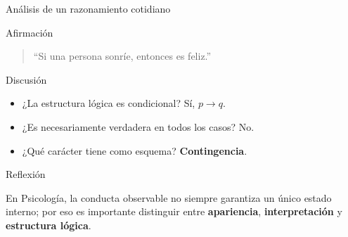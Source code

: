 \documentclass[aspectratio=169,10pt,handout]{beamer}
\newcommand{\destacado}[1]{\textcolor{PsyPrimary}{\textbf{#1}}}
\newenvironment{IdeaClave}[1]
{
	\begin{block}{#1}
		\justifying
	}
	{
	\end{block}
}
\newenvironment{Alerta}[1]
{
	\begin{alertblock}{#1}
		\justifying
	}
	{
	\end{alertblock}
}
\newenvironment{Ejemplo}[1]
{
	\begin{exampleblock}{#1}
		\justifying
	}
	{
	\end{exampleblock}
}
\begin{document}
	\begin{frame}{Análisis de un razonamiento cotidiano}
		\begin{Alerta}{Afirmación}
			\begin{quote}
				``Si una persona sonríe, entonces es feliz.''
			\end{quote}
		\end{Alerta}
		
		\pause
		
		\begin{IdeaClave}{Discusión}
			\begin{itemize}[leftmargin=*]
				\item ¿La estructura lógica es condicional? Sí, $p \to q$.
				\item ¿Es necesariamente verdadera en todos los casos? No.
				\item ¿Qué carácter tiene como esquema? \destacado{Contingencia}.
			\end{itemize}
		\end{IdeaClave}
		
		\pause
		
		\begin{Ejemplo}{Reflexión}
			En Psicología, la conducta observable no siempre garantiza un único estado interno; por eso es importante distinguir entre \destacado{apariencia}, \destacado{interpretación} y \destacado{estructura lógica}.
		\end{Ejemplo}
	\end{frame}
	
\end{document}
